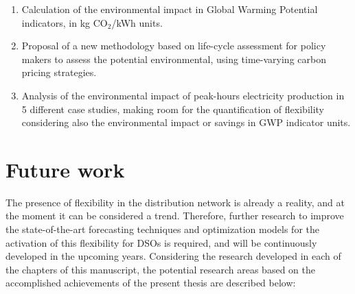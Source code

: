 \begin{itemize}
\begin{enumerate}
		\item Calculation of the environmental impact in Global Warming Potential indicators, in kg CO$_2$/kWh units. 
		\item Proposal of a new methodology based on life-cycle assessment for policy makers to assess the potential environmental, using time-varying carbon pricing strategies. 
		\item Analysis of the environmental impact of peak-hours electricity production in 5 different case studies, making room for the quantification of flexibility considering also the environmental impact or savings in GWP indicator units. 
	\end{enumerate}
\end{itemize}
	


\section{Future work}
The presence of flexibility in the distribution network is already a reality, and at the moment it can be considered a trend. Therefore, further research to improve the state-of-the-art forecasting techniques and optimization models for the activation of this flexibility for DSOs is required, and will be continuously developed in the upcoming years. 
Considering the research developed in each of the chapters of this manuscript, the potential research areas based on the accomplished achievements of the present thesis are described below: 

